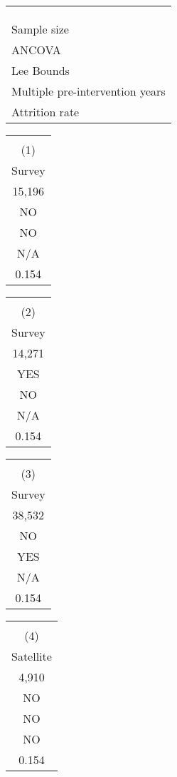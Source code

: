 \begin{tabular}{l} \hline \hline \\[-2mm] \\ \\ \hline Sample size \\ ANCOVA \\ Lee Bounds \\ Multiple pre-intervention years \\ Attrition rate \\ \hline \end{tabular}%
\begin{tabular}{c} \hline \hline \\[-2mm] (1) \\ Survey \\ \hline    15,196 \\ NO \\ NO \\ N/A \\     0.154 \\ \hline \end{tabular}%
\begin{tabular}{c} \hline \hline \\[-2mm] (2) \\ Survey \\ \hline    14,271 \\ YES \\ NO \\ N/A \\     0.154 \\ \hline \end{tabular}%
\begin{tabular}{c} \hline \hline \\[-2mm] (3) \\ Survey \\ \hline    38,532 \\ NO \\ YES \\ N/A \\     0.154  \\\hline \end{tabular}%
\begin{tabular}{c} \hline \hline \\[-2mm] (4) \\ Satellite \\ \hline     4,910 \\ NO \\ NO \\ NO \\     0.154 \\ \hline \end{tabular}%
